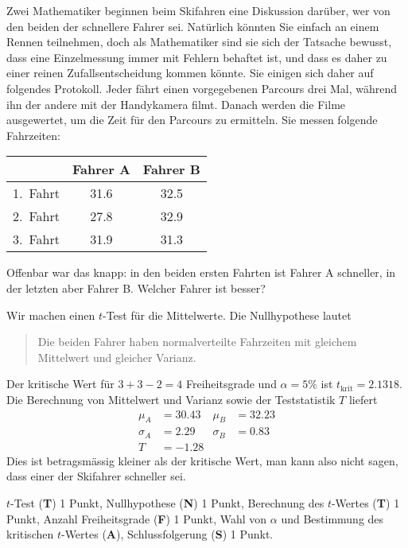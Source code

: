 Zwei Mathematiker beginnen beim Skifahren eine Diskussion darüber, 
wer von den beiden der schnellere Fahrer sei.
Natürlich könnten Sie einfach an einem Rennen teilnehmen, doch
als Mathematiker sind sie sich der Tatsache bewusst, dass eine
Einzelmessung immer mit Fehlern behaftet ist, und dass es daher
zu einer reinen Zufallsentscheidung kommen könnte. Sie einigen sich daher
auf folgendes Protokoll. Jeder fährt einen vorgegebenen Parcours
drei Mal, während ihn der andere mit der Handykamera filmt.
Danach werden die Filme ausgewertet, um die Zeit für den Parcours
zu ermitteln. Sie messen folgende Fahrzeiten:
\begin{center}
\begin{tabular}{|l|c|c|}
\hline
        &Fahrer A&Fahrer B\\
\hline
1.~Fahrt&  31.6  &  32.5  \\
2.~Fahrt&  27.8  &  32.9  \\
3.~Fahrt&  31.9  &  31.3  \\
\hline
\end{tabular}
\end{center}
Offenbar war das knapp: in den beiden ersten Fahrten ist Fahrer A schneller,
in der letzten aber Fahrer B.
Welcher Fahrer ist besser?


\begin{loesung}
Wir machen einen $t$-Test für die Mittelwerte.
Die Nullhypothese lautet
\begin{quote}
Die beiden Fahrer haben normalverteilte Fahrzeiten mit gleichem
Mittelwert und gleicher Varianz.
\end{quote}
Der kritische Wert für $3+3-2=4$ Freiheitsgrade und $\alpha=5\%$
ist $t_{\text{krit}}=2.1318$.
Die Berechnung von Mittelwert und Varianz sowie der Teststatistik $T$
liefert
\begin{align*}
\mu_A&=30.43
&
\mu_B&=32.23
\\
\sigma_A&=2.29
&
\sigma_B&=0.83
\\
T&=-1.28
\end{align*}
Dies ist betragsmässig kleiner als der kritische Wert,
man kann also nicht sagen, dass einer der Skifahrer schneller sei.
\end{loesung}

\begin{bewertung}
$t$-Test ({\bf T}) 1 Punkt,
Nullhypothese ({\bf N}) 1 Punkt,
Berechnung des $t$-Wertes ({\bf T}) 1 Punkt,
Anzahl Freiheitsgrade ({\bf F}) 1 Punkt,
Wahl von $\alpha$ und Bestimmung des kritischen $t$-Wertes ({\bf A}),
Schlussfolgerung ({\bf S}) 1 Punkt.
\end{bewertung}

